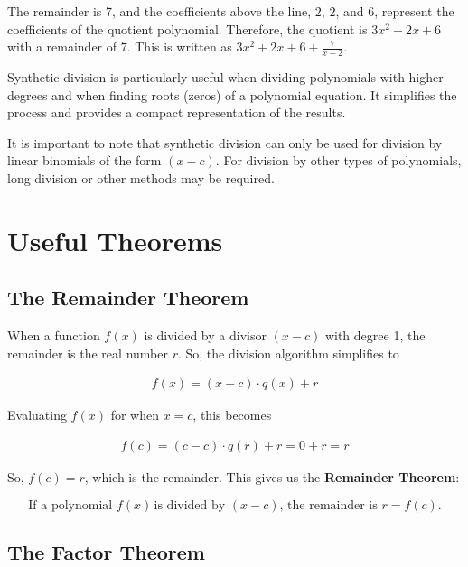 \documentclass[11pt]{article}
\begin{document}
The remainder is 7, and the coefficients above the line, $2$, $2$, and $6$, represent the coefficients of the quotient polynomial. Therefore, the quotient is $3x^2 + 2x + 6$ with a remainder of $7$. This is written as $3x^2 + 2x + 6 + \frac{7}{x-2}$.

Synthetic division is particularly useful when dividing polynomials with higher degrees and when finding roots (zeros) of a polynomial equation. It simplifies the process and provides a compact representation of the results.

It is important to note that synthetic division can only be used for division by linear binomials of the form $(x - c)$. For division by other types of polynomials, long division or other methods may be required.

\section{Useful Theorems}

\subsection{The Remainder Theorem}

When a function $f(x)$ is divided by a divisor $(x - c)$ with degree 1, the remainder is the real number $r$. So, the division algorithm simplifies to

\begin{align*}
    f(x) = (x - c)\cdot q(x) + r
\end{align*}

Evaluating $f(x)$ for when $x = c$, this becomes

\begin{align*}
    f(c) = (c - c)\cdot q(r) + r = 0 + r = r
\end{align*}

So, $f(c) = r$, which is the remainder. This gives us the \textbf{Remainder Theorem}: 

\begin{center}
\begin{equation*}
\textrm{If a polynomial }  f(x) \, \textrm{is divided by } (x - c), \, \textrm{the remainder is } r = f(c).
\end{equation*}
\end{center}

\subsection{The Factor Theorem}
\end{document}

